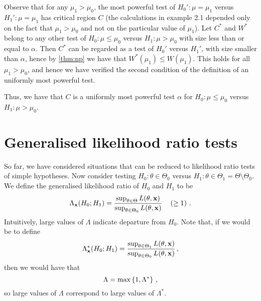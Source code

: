 Observe that for any $\mu_1 > \mu_0$, the most powerful test of $H_0' : \mu = \mu_1$ versus $H_1' : \mu = \mu_1$ has critical region $C$ (the calculations in example 2.1 depended only on the fact that $\mu_1 > \mu_0$ and not on the particular value of $\mu_1$).
Let $C^*$ and $W^*$ belong to any other test of $H_0 : \mu \leq \mu_0$ versus $H_1 : \mu > \mu_0$ with size less than or equal to $\alpha$.
Then $C^*$ can be regarded as a test of $H_0'$ versus $H_1'$, with size smaller than $\alpha$, hence by \cref{thm:np} we have that $W^*(\mu_1) \leq W(\mu_1)$. This holds for all $\mu_1 > \mu_0$, and hence we have verified the second condition of the definition of an uniformly most powerful test.

Thus, we have that $C$ is a uniformly most powerful test $\alpha$ for $H_0 : \mu \leq \mu_0$ versus $H_1 : \mu > \mu_0$.

\section{Generalised likelihood ratio tests}

So far, we have considered situations that can be reduced to likelihood ratio tests of simple hypotheses.
Now consider testing $H_0 : \theta \in \Theta_0$ versus $H_1 : \theta \in \Theta_1 = \Theta \setminus \Theta_0$.
We define the generalised likelihood ratio of $H_0$ and $H_1$ to be
\[
\Lambda_{\mathbf{x}} (H_0; H_1)  = \frac{\sup_{\theta \in \Theta} L(\theta, \mathbf{x})}{\sup_{\theta \in \Theta_0} L(\theta, \mathbf{x})} \quad \left(\geq 1\right) \, {.}
\]
Intuitively, large values of $\Lambda$ indicate departure from $H_0$.
Note that, if we would be to define
\[
\Lambda^*_{\mathbf{x}} (H_0; H_1)= \frac{\sup_{\theta \in \Theta_1} L(\theta, \mathbf{x})}{\sup_{\theta \in \Theta_0} L(\theta, \mathbf{x})} \, {,}
\]
then we would have that
\[
\Lambda = \max \left\{1, \Lambda^*\right\} \, {,}
\]
so large values of $\Lambda$ correspond to large values of $\Lambda^*$.


